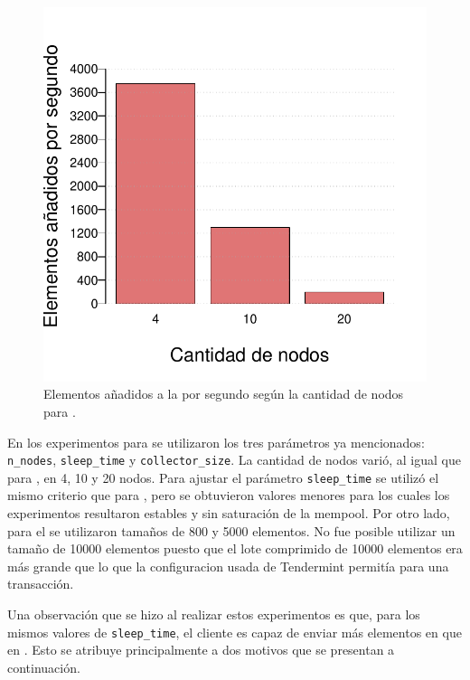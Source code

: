 \subsection{\compresschain}

\begin{figure}
	\centering
	\includegraphics[scale=0.5]{figures/compresschain_results.pdf}
	\caption{Elementos añadidos a la \setchain por segundo según la cantidad de nodos para \compresschain.}
	\label{fig:compresschain_results}
\end{figure}

En los experimentos para \compresschain se utilizaron los tres parámetros ya mencionados: \texttt{n\_nodes},
\texttt{sleep\_time} y \texttt{collector\_size}.
La cantidad de nodos varió, al igual que para \vanilla, en 4, 10 y 20 nodos.
Para ajustar el parámetro \texttt{sleep\_time} se utilizó el mismo criterio que para \vanilla, pero se obtuvieron valores 
menores para los cuales los experimentos resultaron estables y sin saturación de la mempool.
Por otro lado, para el \collector se utilizaron tamaños de 800 y 5000 elementos.
No fue posible utilizar un tamaño de 10000 elementos puesto que el lote comprimido de 10000 elementos era más grande
que lo que la configuracion usada de Tendermint permitía para una transacción. 

Una observación que se hizo al realizar estos experimentos es que, para los mismos valores de \texttt{sleep\_time},
el cliente es capaz de enviar más elementos en \compresschain que en \vanilla.
Esto se atribuye principalmente a dos motivos que se presentan a continuación.

